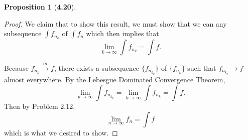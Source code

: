 \documentclass[12pt]{article}
\newcommand{\toM}{\overset{m}{\to}}
\theoremstyle{definition}
\newtheorem*{prop}{Proposition}
\begin{document}
\begin{prop}[\textbf{4.20}]
\begin{enumerate}[label = (\arabic{*})]
            \begin{proof}
                We claim that to show this result, we must show that we can any subsequence \( \displaystyle \int f_{n_{k}} \) of \( \int f_n \) which then implies that
                    \[
                        \lim_{k \to \infty} \int f_{n_{k}} = \int f.  
                    \]
                
                Because \( f_{n_{k}} \toM f\), there exists a subsequence \( \{f_{n_{k_{p}}}\} \) of \( \{f_{n_{k}}\} \) such that 
                \( f_{n_{k_{p}}} \to f \) almost everywhere. By the Lebesgue Dominated Convergence Theorem,
                    \[
                        \lim_{p \to \infty} \int f_{n_{k_{p}}} = \lim_{k \to \infty} \int  f_{n_{k}} =  \int f.
                    \]
                Then by Problem 2.12,
                    \[
                        \lim_{n \to \infty} f_n = \int f  
                    \]
                which is what we desired to show.
            \end{proof}
    \end{enumerate}
\end{prop}
\end{document}
